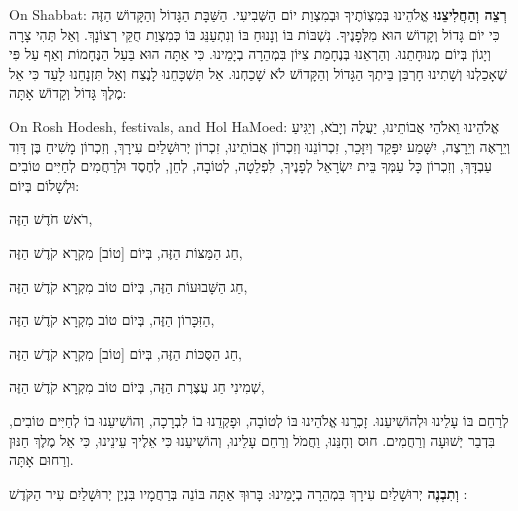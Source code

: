 \begin{seasonal}{On Shabbat:}
\textbf{רְצֵה וְהַחֲלִיצֵנוּ} \Shem{} אֱלֹהֵינוּ בְּמִצְוֹתֶיךָ וּבְמִצְוַת יוֹם הַשְּׁבִיעִי. הַשַּׁבָּת הַגָּדוֹל וְהַקָּדוֹשׁ הַזֶּה כִּי יוֹם גָּדוֹל וְקָדוֹשׁ הוּא מִלְּפָנֶיךָ. נִשְׁבּוֹת בּוֹ וְנָנוּחַ בּוֹ וְנִתְעַנֵּג בּוֹ כְּמִצְוַת חֻקֵּי רְצוֹנָךְ. וְאַל תְּהִי צָרָה וְיָגוֹן בְּיוֹם מְנוּחָתֵנוּ. וְהַרְאֵנוּ בְּנֶחָמַת צִיּוֹן בִּמְהֵרָה בְיָמֵינוּ. כִּי אַתָּה הוּא בַּעַל הַנֶּחָמוֹת וְאַף עַל פִּי שֶׁאָכַלְנוּ וְשָׁתִינוּ חָרְבַּן בֵּיתְךָ הַגָּדוֹל וְהַקָּדוֹשׁ לֹא שָׁכַחְנוּ. אַל תִּשְׁכָּחֵנוּ לָנֶצַח וְאַל תִּזְנָחֵנוּ לָעַד כִּי אֵל מֶלֶךְ גָּדוֹל וְקָדוֹשׁ אָתָּה:
\end{seasonal}

\begin{seasonal}{On Rosh Hodesh, festivals, and Hol HaMoed:}
אֱלֹהֵינוּ וֵאלֹהֵי אֲבוֹתֵינוּ, יַעֲלֶה וְיָבֹא, וְיַגִּיעַ וְיֵרָאֶה וְיֵרָצֶה, יִשָּׁמַע יִפָּקֵד וְיִזָּכֵר, זִכְרוֹנֵנוּ וְזִכְרוֹן אֲבוֹתֵינוּ, זִכְרוֹן יְרוּשָׁלַיִם עִירָךְ, וְזִכְרוֹן מָשִׁיחַ בֶּן דָּוִד עַבְדָּךְ, וְזִכְרוֹן כָּל עַמְּךָ בֵּית יִשְׂרָאֵל לְפָנֶיךָ, לִפְלֵטָה, לְטוֹבָה, לְחֵן, לְחֶסֶד וּלְרַחֲמִים לְחַיִּים טוֹבִים וּלְשָׁלוֹם בְּיוֹם:

רֹאשׁ חֹדֶשׁ הַזֶּה,

חַג הַמַּצּוֹת הַזֶּה, בְּיוֹם [טוֹב] מִקְרָא קֹדֶשׁ הַזֶּה,

חַג הַשָּׁבוּעוֹת הַזֶּה, בְּיוֹם טוֹב מִקְרָא קֹדֶשׁ הַזֶּה,

הַזִּכָּרוֹן הַזֶּה, בְּיוֹם טוֹב מִקְרָא קֹדֶשׁ הַזֶּה,

חַג הַסֻּכּוֹת הַזֶּה, בְּיוֹם [טוֹב] מִקְרָא קֹדֶשׁ הַזֶּה,

שְׁמִינִי חַג עֲצֶרֶת הַזֶּה, בְּיוֹם טוֹב מִקְרָא קֹדֶשׁ הַזֶּה,

לְרַחֵם בּוֹ עָלֵינוּ וּלְהוֹשִׁיעֵנוּ. זָכְרֵנוּ \Shem{} אֱלֹהֵינוּ בּוֹ לְטוֹבָה, וּפָקְדֵנוּ בוֹ לִבְרָכָה, וְהוֹשִׁיעֵנוּ בוֹ לְחַיִּים טוֹבִים, בִּדְבַר יְשׁוּעָה וְרַחֲמִים. חוּס וְחָנֵּנוּ, וַחֲמֹל וְרַחֵם עָלֵינוּ, וְהוֹשִׁיעֵנוּ כִּי אֵלֶיךָ עֵינֵינוּ, כִּי אֵל מֶלֶךְ חַנּוּן וְרַחוּם אָתָּה.
\end{seasonal}

\textbf{וְתִבְנֶה} יְרוּשָׁלַיִם עִירָךְ בִּמְהֵרָה בְיָמֵינוּ: בָּרוּךְ אַתָּה \Shem{} בּוֹנֵה בְּרַחֲמָיו בִּנְיַן יְרוּשָׁלַיִם עִיר הַקֹּדֶשׁ :

